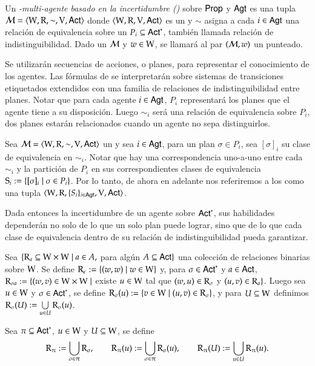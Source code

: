 \begin{definicion}
    Un \emph{\lts-multi-agente basado en la incertidumbre (\ults)} sobre $\PROP$ y $\AGT$ es una tupla $\model = \tup{\W,\R,\sim,\V,\ACT}$ 
    donde $\tup{\W,\R,\V,\ACT}$ es un \lts y $\sim$ asigna a cada $i \in \AGT$ una relación de equivalencia sobre un 
    $P_i \subseteq \ACT^*$, también llamada relación de indistinguibilidad. Dado un \ults $\modults$ y $w \in \W$, se llamará 
    al par $(\modults,w)$ un \ults punteado.
\end{definicion}

Se utilizarán secuencias de acciones, o planes, para representar el conocimiento de los agentes. Las fórmulas de \KHilogic 
se interpretarán sobre sistemas de transiciones etiquetados extendidos con una familia de relaciones de indistinguibilidad entre planes. 
Notar que para cada agente $i \in \AGT$, $P_i$ representará los planes que el agente tiene a su disposición. Luego $\sim_i$ 
será una relación de equivalencia sobre $P_i$, dos planes estarán relacionados cuando un agente no sepa distinguirlos.

Sea $\model = \tup{\W,\R,\sim,\V,\ACT}$ un \ults y sea $i \in \AGT$, para un plan $\sigma \in P_i$, sea $[\sigma]_i$ su clase de 
equivalencia en $\sim_i$. Notar que hay una correspondencia uno-a-uno entre cada $\sim_i$ y la partición de $P_i$ en sus correspondientes 
clases de equivalencia $\S_i := \{[\sigma]_i \mid \sigma \in P_i\}$. Por lo tanto, de ahora en adelante nos referiremos a los \ults como
una tupla $\tup{\W,\R,\{S_i\}_{i \in \AGT},\V,\ACT}$.

Dada entonces la incertidumbre de un agente sobre $\ACT^*$, sus habilidades dependerán no solo de lo que un solo plan puede lograr, sino que de 
lo que cada clase de equivalencia dentro de su relación de indistinguibilidad pueda garantizar.


\begin{definicion}
    Sea $\{\R_a \subseteq \W \times \W \mid a \in A,$ para algún $A \subseteq \ACT \}$ una colección de relaciones binarias sobre $\W$. 
    Se define $\R_\epsilon := \{(w,w) \mid w \in \W\}$ y, para $\sigma \in \ACT^*$ y $a \in \ACT$, 
    $\R_{\sigma a} := \{(w,v) \in \W \times \W \mid$ existe $u \in \W$ tal que $(w,u) \in \R_\sigma$ y $(u,v) \in \R_a \}$. 
    Luego sea $u \in \W$ y $\sigma \in \ACT^*$, se define $\R_\sigma(u) := \{v\in\W \mid (u,v) \in \R_\sigma\}$, y para $U\subseteq\W$ 
    definimos $\R_\sigma(U) := \bigcup\limits_{u \in U} \R_\sigma(u)$.

    Sea $\pi \subseteq \ACT^*$, $u \in \W$ y $U \subseteq \W$, se define
    \[
        \R_\strategy := \bigcup_{\sigma \in \strategy} \R_{\sigma},
    \qquad
        \R_{\strategy}(u) := \bigcup_{\sigma \in \strategy} \R_\sigma(u),
    \qquad
        \R_{\strategy}(U) := \bigcup_{u \in U} \R_{\strategy}(u).
    \]
\end{definicion}

